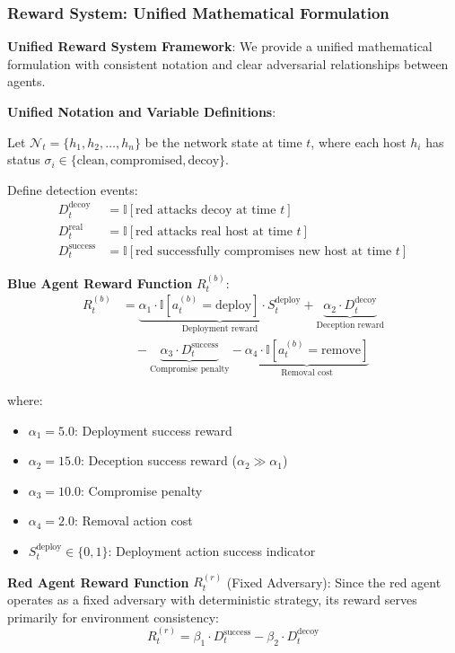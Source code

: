 \documentclass[12pt,oneside,a4paper]{article}
\theoremstyle{definition}
\theoremstyle{plain}
\begin{document}
\subsubsection{Reward System: Unified Mathematical Formulation}

\textbf{Unified Reward System Framework}: We provide a unified mathematical formulation with consistent notation and clear adversarial relationships between agents.

\textbf{Unified Notation and Variable Definitions}:

Let $\mathcal{N}_t = \{h_1, h_2, \ldots, h_n\}$ be the network state at time $t$, where each host $h_i$ has status $\sigma_i \in \{\text{clean}, \text{compromised}, \text{decoy}\}$. 

Define detection events:
\begin{align}
D_t^{\text{decoy}} &= \mathbb{I}[\text{red attacks decoy at time } t] \\
D_t^{\text{real}} &= \mathbb{I}[\text{red attacks real host at time } t] \\
D_t^{\text{success}} &= \mathbb{I}[\text{red successfully compromises new host at time } t]
\end{align}

\textbf{Blue Agent Reward Function} $R_t^{(b)}$:
\begin{align}
R_t^{(b)} &= \underbrace{\alpha_1 \cdot \mathbb{I}[a_t^{(b)} = \text{deploy}] \cdot S_t^{\text{deploy}}}_{\text{Deployment reward}} + \underbrace{\alpha_2 \cdot D_t^{\text{decoy}}}_{\text{Deception reward}} \nonumber \\
&\quad - \underbrace{\alpha_3 \cdot D_t^{\text{success}}}_{\text{Compromise penalty}} - \underbrace{\alpha_4 \cdot \mathbb{I}[a_t^{(b)} = \text{remove}]}_{\text{Removal cost}}
\end{align}

where:
\begin{itemize}
\item $\alpha_1 = 5.0$: Deployment success reward
\item $\alpha_2 = 15.0$: Deception success reward ($\alpha_2 \gg \alpha_1$)
\item $\alpha_3 = 10.0$: Compromise penalty  
\item $\alpha_4 = 2.0$: Removal action cost
\item $S_t^{\text{deploy}} \in \{0, 1\}$: Deployment action success indicator
\end{itemize}

\textbf{Red Agent Reward Function} $R_t^{(r)}$ (Fixed Adversary):
Since the red agent operates as a fixed adversary with deterministic strategy, its reward serves primarily for environment consistency:
\begin{equation}
R_t^{(r)} = \beta_1 \cdot D_t^{\text{success}} - \beta_2 \cdot D_t^{\text{decoy}}
\end{equation}
\end{document}
